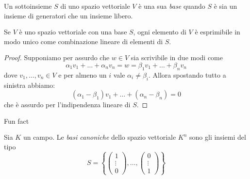 \documentclass[11pt]{scrartcl}
\begin{document}
	\begin{definition}
		Un sottoinsieme $S$ di uno spazio vettoriale $V$ è una sua \textit{base} quando $S$ è sia un insieme di generatori che un insieme libero.
	\end{definition}
	\begin{theorem}
		Se $V$ è uno spazio vettoriale con una base $S$, ogni elemento di $V$ è esprimibile in modo unico come combinazione lineare di elementi di $S$.
	\end{theorem}
	\begin{proof}
		Supponiamo per assurdo che $w\in V$ sia scrivibile in due modi come
		$$\alpha_1v_1+\dots+\alpha_nv_n=w=\beta_1v_1+\dots+\beta_nv_n$$
		dove $v_1,\dots,v_n\in V$ e per almeno un $i$ vale $\alpha_i\ne \beta_i$. Allora spostando tutto a sinistra abbiamo:
		$$(\alpha_1-\beta_1)v_1+\dots+(\alpha_n-\beta_n)=0$$
		che è assurdo per l'indipendenza lineare di $S$.
	\end{proof}
	Fun fact
	\begin{definition}
		Sia $K$ un campo. Le \textit{basi canoniche} dello spazio vettoriale $K^n$ sono gli insiemi del tipo
		$$S=
		\left\{\begin{pmatrix}
			1 \\
			\vdots \\
			0
		\end{pmatrix},\dots,
		\begin{pmatrix}
			0 \\
			\vdots \\
			1
		\end{pmatrix}\right\}$$
	\end{definition}
	
\end{document}
